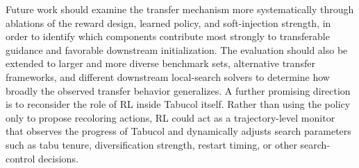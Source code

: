 Future work should examine the transfer mechanism more systematically through
ablations of the reward design, learned policy, and soft-injection strength, in
order to identify which components contribute most strongly to transferable
guidance and favorable downstream initialization. The evaluation should also
be extended to larger and more diverse benchmark sets, alternative transfer
frameworks, and different downstream local-search solvers to determine how
broadly the observed transfer behavior generalizes. A further promising
direction is to reconsider the role of RL inside Tabucol itself. Rather than
using the policy only to propose recoloring actions, RL could act as a
trajectory-level monitor that observes the progress of Tabucol and dynamically
adjusts search parameters such as tabu tenure, diversification strength,
restart timing, or other search-control decisions. 